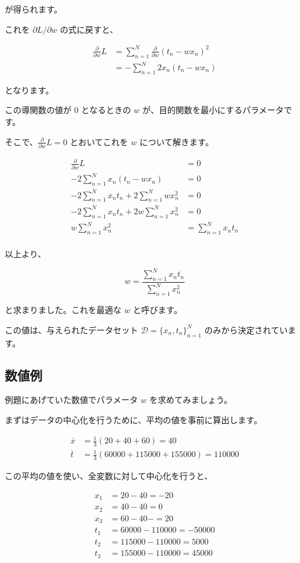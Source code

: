 が得られます。


これを $\partial L / \partial w$ の式に戻すと、


\[
\begin{aligned}
\frac{\partial}{\partial w}
L
&= \sum_{n=1}^N \frac{\partial}{\partial w} (t_n - wx_n)^2 \\
&= -\sum_{n=1}^N 2x_n(t_n - wx_n)
\end{aligned}
\]


となります。


この導関数の値が $0$ となるときの $w$ が、目的関数を最小にするパラメータです。

そこで、$\frac{\partial}{\partial w} L = 0$ とおいてこれを $w$ について解きます。


\[
\begin{aligned}
\frac{\partial}{\partial w} L &= 0 \\
-2 \sum_{n=1}^N x_n (t_n - wx_n) &= 0 \\
-2 \sum_{n=1}^N x_n t_n + 2 \sum_{n=1}^N wx^2_n &= 0 \\
-2 \sum_{n=1}^N x_n t_n + 2 w \sum_{n=1}^N x^2_n &= 0 \\
w \sum_{n=1}^N x^2_n &= \sum_{n=1}^N x_n t_n \\
\end{aligned}
\]


以上より、


\[
w = \frac{\sum_{n=1}^N x_n t_n}{\sum_{n=1}^N x^2_n}
\]


と求まりました。これを最適な $w$ と呼びます。

この値は、与えられたデータセット $\mathcal{D} = \{x_n, t_n\}_{n=1}^{N}$ のみから決定されています。


\subsection{数値例}


例題にあげていた数値でパラメータ $w$ を求めてみましょう。


まずはデータの中心化を行うために、平均の値を事前に算出します。


\[
\begin{aligned}
\bar{x} &= \frac{1}{3} (20 + 40 + 60) = 40 \\
\bar{t} &= \frac{1}{3} (60000 + 115000 + 155000) = 110000
\end{aligned}
\]


この平均の値を使い、全変数に対して中心化を行うと、


\[
\begin{aligned}
x_{1} &= 20 - 40 = -20 \\
x_{2} &= 40 -40 = 0 \\
x_{3} &= 60- 40- = 20 \\
t_{1} &= 60000 - 110000 = -50000 \\
t_{2} &= 115000- 110000 = 5000 \\
t_{3} &= 155000 - 110000 = 45000
\end{aligned}
\]


